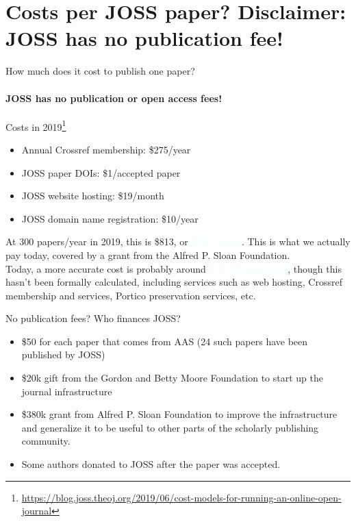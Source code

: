 \section{Costs per JOSS paper? Disclaimer: JOSS has no publication fee!}

\begin{frame}{  How much does it cost to publish one paper?}
\framesubtitle{JOSS has no publication or open access fees! }

\begin{block}{Costs in 2019\footnote{\tiny\url{https://blog.joss.theoj.org/2019/06/cost-models-for-running-an-online-open-journal}}}
\begin{itemize}
\item  Annual Crossref membership: \$275/year
\item  JOSS paper DOIs: \$1/accepted paper
\item  JOSS website hosting: \$19/month
\item  JOSS domain name registration: \$10/year
\end{itemize}
\end{block}
At 300 papers/year in 2019, this is \$813, or \textcolor{azure}{\$2.71/paper}. This is what we actually pay today, covered by a grant from the Alfred P. Sloan Foundation.\\
\vspace{0.5cm}
Today, a more accurate cost is probably around \textcolor{azure}{\$4-US\$5 per paper}, though this hasn't been formally calculated, including services such as web hosting, Crossref membership and services, Portico preservation services, etc. 

\end{frame}

\begin{frame}{No publication fees? Who finances JOSS? }

\begin{itemize}
\item \$50 for each paper that comes from AAS (24 such papers have been published by JOSS)
\item \$20k gift from the Gordon and Betty Moore Foundation to start up the journal infrastructure 
\item \$380k grant from Alfred P. Sloan Foundation to improve the infrastructure and generalize it to be useful to other parts of the scholarly publishing community. 
\item Some authors donated to JOSS after the paper was accepted.
\end{itemize}

\end{frame}

